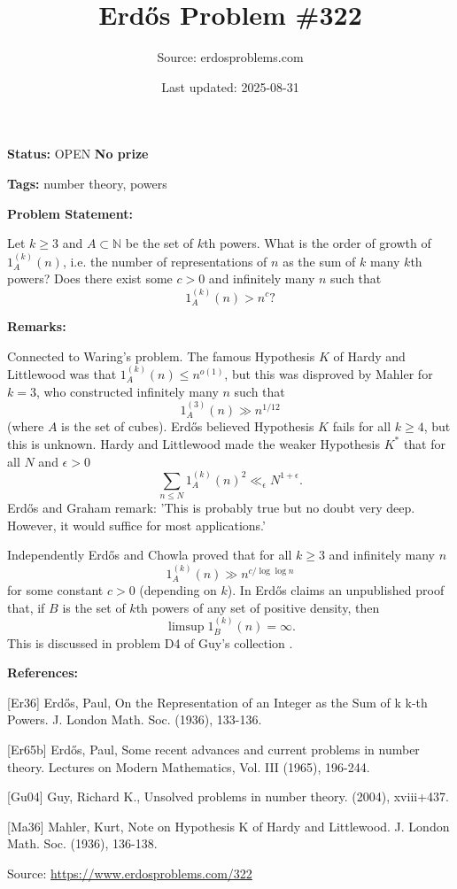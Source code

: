 \documentclass{article}
\title{Erd\H{o}s Problem \#322}
\date{Last updated: 2025-08-31}
\author{Source: erdosproblems.com}
\begin{document}
\maketitle

\noindent\textbf{Status:} OPEN \quad \textbf{No prize}

\noindent\textbf{Tags:} number theory, powers

\medskip
\noindent\textbf{Problem Statement:}

Let $k\geq 3$ and $A\subset \mathbb{N}$ be the set of $k$th powers. What is the order of growth of $1_A^{(k)}(n)$, i.e. the number of representations of $n$ as the sum of $k$ many $k$th powers? Does there exist some $c>0$ and infinitely many $n$ such that\[1_A^{(k)}(n) >n^c?\]

\bigskip
\noindent\textbf{Remarks:}

Connected to Waring's problem. The famous Hypothesis $K$ of Hardy and Littlewood was that $1_A^{(k)}(n)\leq n^{o(1)}$, but this was disproved by Mahler \cite{Ma36} for $k=3$, who constructed infinitely many $n$ such that\[1_A^{(3)}(n)\gg n^{1/12}\](where $A$ is the set of cubes). Erd\H{o}s believed Hypothesis $K$ fails for all $k\geq 4$, but this is unknown. Hardy and Littlewood made the weaker Hypothesis $K^*$ that for all $N$ and $\epsilon>0$\[\sum_{n\leq N}1_A^{(k)}(n)^2 \ll_\epsilon N^{1+\epsilon}.\]Erd\H{o}s and Graham remark: 'This is probably true but no doubt very deep. However, it would suffice for most applications.'

Independently Erd\H{o}s \cite{Er36} and Chowla proved that for all $k\geq 3$ and infinitely many $n$\[1_A^{(k)}(n) \gg n^{c/\log\log n}\]for some constant $c>0$ (depending on $k$). In \cite{Er65b} Erd\H{o}s claims an unpublished proof that, if $B$ is the set of $k$th powers of any set of positive density, then\[\limsup 1_B^{(k)}(n)=\infty.\]This is discussed in problem D4 of Guy's collection \cite{Gu04}.

\bigskip
\noindent\textbf{References:}

[Er36] Erd\H{o}s, Paul, On the Representation of an Integer as the Sum of k k-th
Powers. J. London Math. Soc. (1936), 133-136.
 
 [Er65b] Erd\H{o}s, Paul, Some recent advances and current problems in number theory. Lectures on Modern Mathematics, Vol. III (1965), 196-244.
 
 [Gu04] Guy, Richard K., Unsolved problems in number theory. (2004), xviii+437.
 
 [Ma36] Mahler, Kurt, Note on Hypothesis K of Hardy and Littlewood. J. London Math. Soc. (1936), 136-138.

\bigskip
\noindent\small{Source: \url{https://www.erdosproblems.com/322}}
\end{document}
